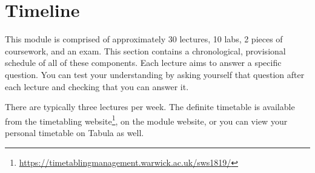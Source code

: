\section{Timeline}
\label{sec:timeline}

This module is comprised of approximately 30 lectures, 10 labs, 2 pieces of coursework, and an exam. This section contains a chronological, provisional schedule of all of these components. Each lecture aims to answer a specific question. You can test your understanding by asking yourself that question after each lecture and checking that you can answer it. 

There are typically three lectures per week. The definite timetable is available from the timetabling website\footnote{\url{https://timetablingmanagement.warwick.ac.uk/sws1819/}}, on the module website, or you can view your personal timetable on Tabula as well. 

\newcommand{\foo}{\makebox[0pt]{\textbullet}\hskip-0.5pt\vrule width 1pt\hspace{\labelsep}}

\newcommand{\LectureEntry}[4]{#1 & \begin{tabular}{p{11cm}}
		\textbf{#2} \\
		\emph{#3} \\
		#4
\end{tabular}}
\newcommand{\LabEntry}[3]{#1 & \begin{tabular}{p{11cm}}
		\textbf{#2} \\
		#3
\end{tabular}}

